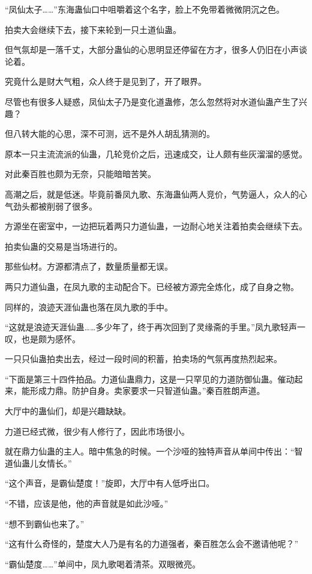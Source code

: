 \begin{this_body}
“凤仙太子……”东海蛊仙口中咀嚼着这个名字，脸上不免带着微微阴沉之色。

拍卖大会继续下去，接下来轮到一只土道仙蛊。

但气氛却是一落千丈，大部分蛊仙的心思明显还停留在方才，很多人仍旧在小声谈论着。

究竟什么是财大气粗，众人终于是见到了，开了眼界。

尽管也有很多人疑惑，凤仙太子乃是变化道蛊修，怎么忽然将对水道仙蛊产生了兴趣？

但八转大能的心思，深不可测，远不是外人胡乱猜测的。

原本一只主流流派的仙蛊，几轮竞价之后，迅速成交，让人颇有些灰溜溜的感觉。

对此秦百胜也颇为无奈，只能暗暗苦笑。

高潮之后，就是低迷。毕竟前番凤九歌、东海蛊仙两人竞价，气势逼人，众人的心气劲头都被削弱了很多。

方源坐在密室中，一边把玩着两只力道仙蛊，一边耐心地关注着拍卖会继续下去。

拍卖仙蛊的交易是当场进行的。

那些仙材。方源都清点了，数量质量都无误。

两只力道仙蛊，在凤九歌的主动配合下。已经被方源完全炼化，成了自身之物。

同样的，浪迹天涯仙蛊也落在凤九歌的手中。

“这就是浪迹天涯仙蛊……多少年了，终于再次回到了灵缘斋的手里。”凤九歌轻声一叹，也是颇为感怀。

一只只仙蛊拍卖出去，经过一段时间的积蓄，拍卖场的气氛再度热烈起来。

“下面是第三十四件拍品。力道仙蛊鼎力，这是一只罕见的力道防御仙蛊。催动起来，能形成力鼎。防护自身。卖家要求一只智道仙蛊。”秦百胜朗声道。

大厅中的蛊仙们，却是兴趣缺缺。

力道已经式微，很少有人修行了，因此市场很小。

就在鼎力仙蛊的主人。暗中焦急的时候。一个沙哑的独特声音从单间中传出：“智道仙蛊儿女情长。”

“这个声音，是霸仙楚度！”旋即，大厅中有人低呼出口。

“不错，应该是他，他的声音就是如此沙哑。”

“想不到霸仙也来了。”

“这有什么奇怪的，楚度大人乃是有名的力道强者，秦百胜怎么会不邀请他呢？”

“霸仙楚度……”单间中，凤九歌喝着清茶。双眼微亮。


\end{this_body}
